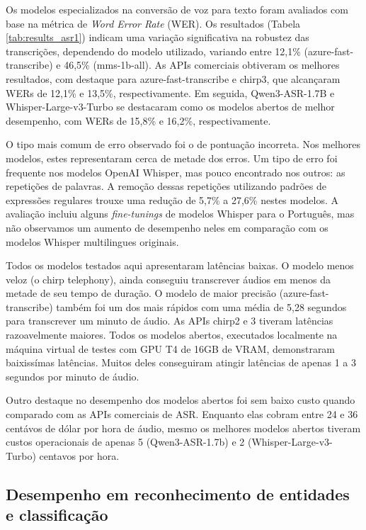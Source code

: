 \documentclass{IEEEphot}
\begin{document}
Os modelos especializados na conversão de voz para texto foram avaliados com base na métrica de \textit{Word Error Rate} (WER). Os resultados (Tabela \ref{tab:results_asr1}) indicam uma variação significativa na robustez das transcrições, dependendo do modelo utilizado, variando entre 12,1\% (azure-fast-transcribe) e 46,5\% (mms-1b-all). As APIs comerciais obtiveram os melhores resultados, com destaque para azure-fast-transcribe e chirp3, que alcançaram WERs de 12,1\% e 13,5\%, respectivamente. Em seguida, Qwen3-ASR-1.7B e Whisper-Large-v3-Turbo se destacaram como os modelos abertos de melhor desempenho, com WERs de 15,8\% e 16,2\%, respectivamente.

O tipo mais comum de erro observado foi o de pontuação incorreta. Nos melhores modelos, estes representaram cerca de metade dos erros. Um tipo de erro foi frequente nos modelos OpenAI Whisper, mas pouco encontrado nos outros: as repetições de palavras. A remoção dessas repetições utilizando padrões de expressões regulares trouxe uma redução de 5,7\% a 27,6\% nestes modelos. A avaliação incluiu alguns \textit{fine-tunings} de modelos Whisper para o Português, mas não observamos um aumento de desempenho neles em comparação com os modelos Whisper multilingues originais.

Todos os modelos testados aqui apresentaram latências baixas. O modelo menos veloz (o chirp telephony), ainda conseguiu transcrever áudios em menos da metade de seu tempo de duração. O modelo de maior precisão (azure-fast-transcribe) também foi um dos mais rápidos com uma média de 5,28 segundos para transcrever um minuto de áudio. As APIs chirp2 e 3 tiveram latências razoavelmente maiores. Todos os modelos abertos, executados localmente na máquina virtual de testes com GPU T4 de 16GB de VRAM, demonstraram baixissímas latências. Muitos deles conseguiram atingir latências de apenas 1 a 3 segundos por minuto de áudio.

Outro destaque no desempenho dos modelos abertos foi sem baixo custo quando comparado com as APIs comerciais de ASR. Enquanto elas cobram entre 24 e 36 centávos de dólar por hora de áudio, mesmo os melhores modelos abertos tiveram custos operacionais de apenas 5 (Qwen3-ASR-1.7b) e 2 (Whisper-Large-v3-Turbo) centavos por hora.


\subsection{Desempenho em reconhecimento de entidades e classificação}
\end{document}
